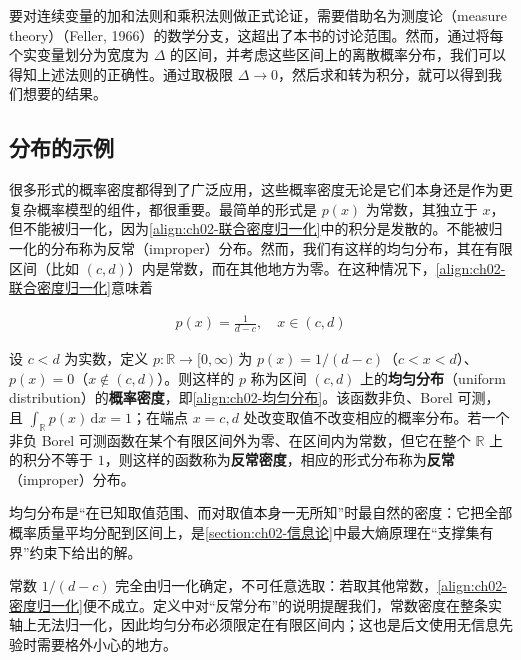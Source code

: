 \documentclass[../../main.tex]{subfiles}
\begin{document}
要对连续变量的加和法则和乘积法则做正式论证，需要借助名为测度论（measure theory）（Feller, 1966）的数学分支，这超出了本书的讨论范围。然而，通过将每个实变量划分为宽度为 $\Delta$ 的区间，并考虑这些区间上的离散概率分布，我们可以得知上述法则的正确性。通过取极限 $\Delta\to0$，然后求和转为积分，就可以得到我们想要的结果。

\subsection{分布的示例}\label{subsection:ch02-分布的示例}

很多形式的概率密度都得到了广泛应用，这些概率密度无论是它们本身还是作为更复杂概率模型的组件，都很重要。最简单的形式是 $p(x)$ 为常数，其独立于 $x$，但不能被归一化，因为\eqref{align:ch02-联合密度归一化}中的积分是发散的。不能被归一化的分布称为反常（improper）分布。然而，我们有这样的均匀分布，其在有限区间（比如 $(c,d)$）内是常数，而在其他地方为零。在这种情况下，\eqref{align:ch02-联合密度归一化}意味着

\begin{align}
  p(x) = \frac{1}{d-c}, \quad x\in(c,d)
  \label{align:ch02-均匀分布}
\end{align}

\begin{definition}[均匀分布]\label{definition:ch02-均匀分布}
设 $c<d$ 为实数，定义 $p:\mathbb{R}\to[0,\infty)$ 为 $p(x)=1/(d-c)$（$c<x<d$）、$p(x)=0$（$x\notin(c,d)$）。则这样的 $p$ 称为区间 $(c,d)$ 上的\textbf{均匀分布}（uniform distribution）的\textbf{概率密度}，即\eqref{align:ch02-均匀分布}。该函数非负、Borel 可测，且 $\int_{\mathbb{R}}p(x)\,\mathrm{d}x=1$；在端点 $x=c,d$ 处改变取值不改变相应的概率分布。若一个非负 Borel 可测函数在某个有限区间外为零、在区间内为常数，但它在整个 $\mathbb{R}$ 上的积分不等于 $1$，则这样的函数称为\textbf{反常密度}，相应的形式分布称为\textbf{反常}（improper）分布。
\end{definition}

\begin{remark}
均匀分布是“在已知取值范围、而对取值本身一无所知”时最自然的密度：它把全部概率质量平均分配到区间上，是\cref{section:ch02-信息论}中最大熵原理在“支撑集有界”约束下给出的解。

常数 $1/(d-c)$ 完全由归一化确定，不可任意选取：若取其他常数，\eqref{align:ch02-密度归一化}便不成立。定义中对“反常分布”的说明提醒我们，常数密度在整条实轴上无法归一化，因此均匀分布必须限定在有限区间内；这也是后文使用无信息先验时需要格外小心的地方。
\end{remark}
\end{document}
